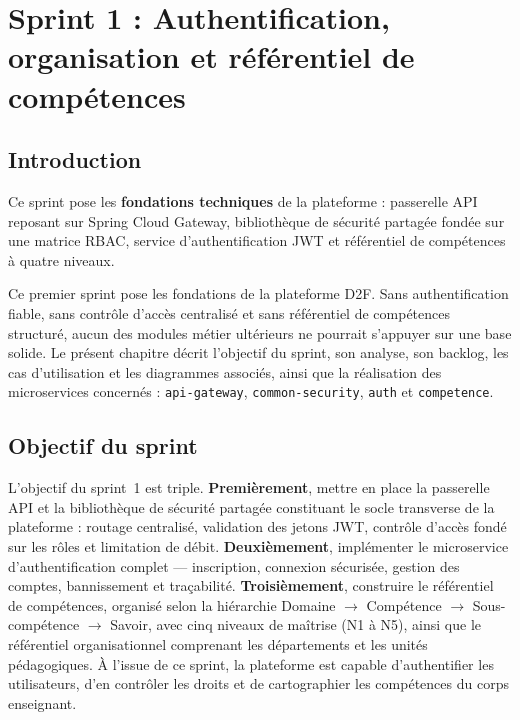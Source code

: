 \documentclass[12pt,a4paper]{report}
\begin{document}
\chapter{Sprint 1 : Authentification, organisation et référentiel de compétences}

\section{Introduction}

\begin{summaryframe}[frametitle={En bref — Sprint 1}]
Ce sprint pose les \textbf{fondations techniques} de la plateforme : passerelle API
reposant sur Spring Cloud Gateway, bibliothèque de sécurité partagée fondée sur une
matrice RBAC, service d'authentification JWT et référentiel de compétences à
quatre niveaux.
\end{summaryframe}

Ce premier sprint pose les fondations de la plateforme D2F. Sans authentification
fiable, sans contrôle d'accès centralisé et sans référentiel de compétences
structuré, aucun des modules métier ultérieurs ne pourrait s'appuyer sur une base
solide. Le présent chapitre décrit l'objectif du sprint, son analyse, son backlog,
les cas d'utilisation et les diagrammes associés, ainsi que la réalisation des
microservices concernés : \texttt{api-gateway}, \texttt{common-security},
\texttt{auth} et \texttt{competence}.

\section{Objectif du sprint}

L'objectif du sprint~1 est triple. \textbf{Premièrement}, mettre en place la
passerelle API et la bibliothèque de sécurité partagée constituant le socle
transverse de la plateforme : routage centralisé, validation des jetons JWT,
contrôle d'accès fondé sur les rôles et limitation de débit. \textbf{Deuxièmement},
implémenter le microservice d'authentification complet — inscription, connexion
sécurisée, gestion des comptes, bannissement et traçabilité. \textbf{Troisièmement},
construire le référentiel de compétences, organisé selon la hiérarchie
Domaine $\rightarrow$ Compétence $\rightarrow$ Sous-compétence $\rightarrow$ Savoir,
avec cinq niveaux de maîtrise (N1 à N5), ainsi que le référentiel organisationnel
comprenant les départements et les unités pédagogiques. À l'issue de ce sprint, la
plateforme est capable d'authentifier les utilisateurs, d'en contrôler les droits
et de cartographier les compétences du corps enseignant.
\end{document}
